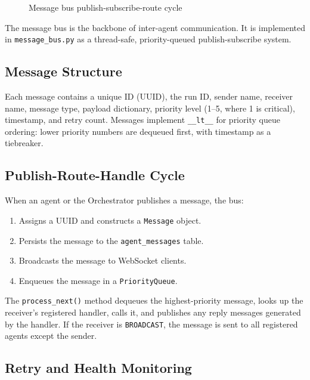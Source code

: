 \begin{figure}[H]
\centering
{}
\caption{Message bus publish-subscribe-route cycle}
\label{fig:message_bus_workflow}
\end{figure}

The message bus is the backbone of inter-agent communication. It is implemented in \texttt{message\_bus.py} as a thread-safe, priority-queued publish-subscribe system.

\subsection{Message Structure}

Each message contains a unique ID (UUID), the run ID, sender name, receiver name, message type, payload dictionary, priority level (1--5, where 1 is critical), timestamp, and retry count. Messages implement \texttt{\_\_lt\_\_} for priority queue ordering: lower priority numbers are dequeued first, with timestamp as a tiebreaker.

\subsection{Publish-Route-Handle Cycle}

When an agent or the Orchestrator publishes a message, the bus:
\begin{enumerate}
    \item Assigns a UUID and constructs a \texttt{Message} object.
    \item Persists the message to the \texttt{agent\_messages} table.
    \item Broadcasts the message to WebSocket clients.
    \item Enqueues the message in a \texttt{PriorityQueue}.
\end{enumerate}

The \texttt{process\_next()} method dequeues the highest-priority message, looks up the receiver's registered handler, calls it, and publishes any reply messages generated by the handler. If the receiver is \texttt{BROADCAST}, the message is sent to all registered agents except the sender.

\subsection{Retry and Health Monitoring}

